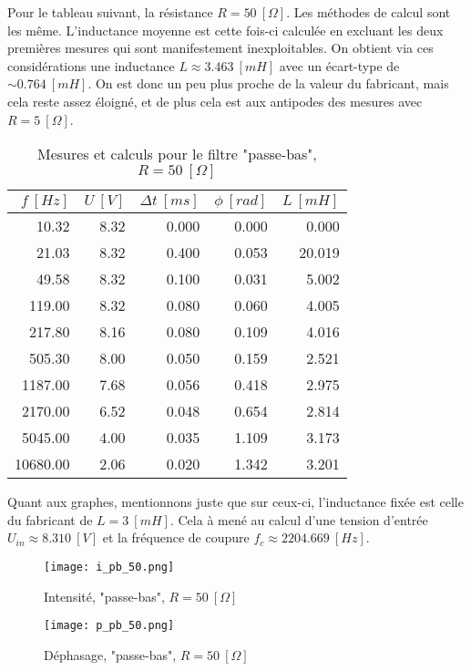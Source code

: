 Pour le tableau suivant, la résistance $R=50 \ [\Omega]$. Les méthodes de calcul sont les même. L'inductance moyenne est cette fois-ci calculée en excluant les deux premières mesures qui sont manifestement inexploitables. On obtient via ces considérations une inductance $L \approx 3.463 \ [mH]$ avec un écart-type de $\sim 0.764 \ [mH]$. On est donc un peu plus proche de la valeur du fabricant, mais cela reste assez éloigné, et de plus cela est aux antipodes des mesures avec $R=5 \ [\Omega]$.

\begin{table}[H]
\centering
\begin{tabular}{rrrrr}
\toprule
 $f \ [Hz]$ &  $U \ [V]$ &  $\Delta t \ [ms]$ &  $\phi \ [rad]$ &  $L \ [mH]$ \\
\midrule
     10.32 &         8.32 &       0.000 &  0.000 &            0.000 \\
     21.03 &         8.32 &       0.400 &  0.053 &           20.019 \\
     49.58 &         8.32 &       0.100 &  0.031 &            5.002 \\
    119.00 &         8.32 &       0.080 &  0.060 &            4.005 \\
    217.80 &         8.16 &       0.080 &  0.109 &            4.016 \\
    505.30 &         8.00 &       0.050 &  0.159 &            2.521 \\
   1187.00 &         7.68 &       0.056 &  0.418 &            2.975 \\
   2170.00 &         6.52 &       0.048 &  0.654 &            2.814 \\
   5045.00 &         4.00 &       0.035 &  1.109 &            3.173 \\
  10680.00 &         2.06 &       0.020 &  1.342 &            3.201 \\
\bottomrule
\end{tabular}
\caption{Mesures et calculs pour le filtre "passe-bas", $R = 50 \ [ \Omega ]$}
\label{tab:p-b-50}
\end{table}

Quant aux graphes, mentionnons juste que sur ceux-ci, l'inductance fixée est celle du fabricant de $L=3 \ [mH]$. Cela à mené au calcul d'une tension d'entrée $U_{in} \approx 8.310 \ [V]$ et la fréquence de coupure $f_c \approx 2204.669 \ [Hz]$.

\begin{minipage}{.5\textwidth}
\begin{figure}[H]
\centering
\texttt{[image: i\_pb\_50.png]}
\caption{Intensité, "passe-bas", $R = 50 \ [ \Omega ]$}
\end{figure}
\end{minipage}
\begin{minipage}{.5\textwidth}
\begin{figure}[H]
\centering
\texttt{[image: p\_pb\_50.png]}
\caption{Déphasage, "passe-bas", $R = 50 \ [ \Omega ]$}
\end{figure}
\end{minipage}


